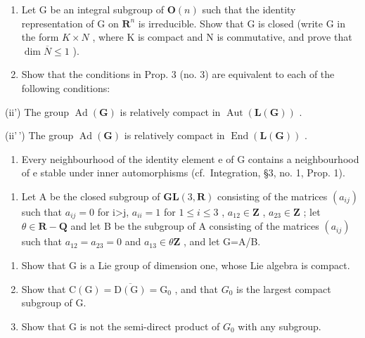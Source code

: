 \begin{enumerate}
\def\labelenumi{\arabic{enumi})}
\setcounter{enumi}{2}
\item
  Let G be an integral subgroup of \(\mathbf{O}(n)\) such that the identity representation of G on \(\mathbf{R}^{n}\) is irreducible. Show that G is closed (write G in the form \(K \times N\) , where K is compact and N is commutative, and prove that \(\dim \overline{N} \leq 1\) ).
\item
  Show that the conditions in Prop. 3 (no. 3) are equivalent to each of the following conditions:
\end{enumerate}

(ii') The group \(\operatorname{Ad}(\mathbf{G})\) is relatively compact in \(\operatorname{Aut}(\mathbf{L}(\mathbf{G}))\) .

(ii'\,') The group \(\operatorname{Ad}(\mathbf{G})\) is relatively compact in \(\operatorname{End}(\mathbf{L}(\mathbf{G}))\) .

\begin{enumerate}
\def\labelenumi{(\alph{enumi})}
\setcounter{enumi}{21}
\tightlist
\item
  Every neighbourhood of the identity element e of G contains a neighbourhood of e stable under inner automorphisms (cf.~Integration, §3, no. 1, Prop. 1).
\end{enumerate}

\begin{enumerate}
\def\labelenumi{\arabic{enumi})}
\setcounter{enumi}{4}
\tightlist
\item
  Let A be the closed subgroup of \(\mathbf{GL}(3,\mathbf{R})\) consisting of the matrices \((a_{ij})\) such that \(a_{ij}=0\) for i\textgreater j, \(a_{ii}=1\) for \(1\leq i\leq3\) , \(a_{12}\in \mathbf{Z}\) , \(a_{23}\in \mathbf{Z}\) ; let \(\theta\in \mathbf{R}-\mathbf{Q}\) and let B be the subgroup of A consisting of the matrices \((a_{ij})\) such that \(a_{12}=a_{23}=0\) and \(a_{13}\in\theta\mathbf{Z}\) , and let G=A/B.
\end{enumerate}

\begin{enumerate}
\def\labelenumi{\alph{enumi})}
\item
  Show that G is a Lie group of dimension one, whose Lie algebra is compact.
\item
  Show that \(\mathrm{C}(\mathrm{G}) = \overline{\mathrm{D}(\mathrm{G})} = \mathrm{G}_{0}\) , and that \(G_{0}\) is the largest compact subgroup of G.
\item
  Show that G is not the semi-direct product of \(G_{0}\) with any subgroup.
\end{enumerate}

